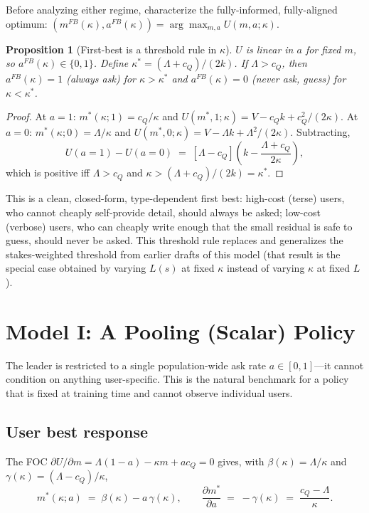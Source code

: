 \documentclass[11pt]{article}
\newtheorem{proposition}{Proposition}
\begin{document}
Before analyzing either regime, characterize the fully-informed, fully-aligned
optimum: $(m^{FB}(\kappa), a^{FB}(\kappa)) = \arg\max_{m,a} U(m,a;\kappa)$.

\begin{proposition}[First-best is a threshold rule in $\kappa$]\label{prop:firstbest}
$U$ is linear in $a$ for fixed $m$, so $a^{FB}(\kappa) \in \{0,1\}$. Define
$\kappa^* = (\Lambda+c_Q)/(2k)$. If $\Lambda > c_Q$, then $a^{FB}(\kappa)=1$
(always ask) for $\kappa > \kappa^*$ and $a^{FB}(\kappa)=0$ (never ask, guess) for
$\kappa < \kappa^*$.
\end{proposition}

\begin{proof}
At $a=1$: $m^*(\kappa;1)=c_Q/\kappa$ and $U(m^*,1;\kappa)=V-c_Qk+c_Q^2/(2\kappa)$.
At $a=0$: $m^*(\kappa;0)=\Lambda/\kappa$ and
$U(m^*,0;\kappa)=V-\Lambda k+\Lambda^2/(2\kappa)$. Subtracting,
\[
U(a{=}1)-U(a{=}0) \;=\; [\Lambda-c_Q]\left(k - \frac{\Lambda+c_Q}{2\kappa}\right),
\]
which is positive iff $\Lambda>c_Q$ and $\kappa>(\Lambda+c_Q)/(2k)=\kappa^*$.
\end{proof}

This is a clean, closed-form, type-dependent first best: high-cost (terse) users,
who cannot cheaply self-provide detail, should always be asked; low-cost (verbose)
users, who can cheaply write enough that the small residual is safe to guess,
should never be asked. This threshold rule replaces and generalizes the
stakes-weighted threshold from earlier drafts of this model (that result is the
special case obtained by varying $L(s)$ at fixed $\kappa$ instead of varying
$\kappa$ at fixed $L$).

\section{Model I: A Pooling (Scalar) Policy}
\label{sec:model1}

The leader is restricted to a single population-wide ask rate $a\in[0,1]$---it
cannot condition on anything user-specific. This is the natural benchmark for a
policy that is fixed at training time and cannot observe individual users.

\subsection{User best response}

The FOC $\partial U/\partial m = \Lambda(1-a) - \kappa m + ac_Q = 0$ gives, with
$\beta(\kappa)=\Lambda/\kappa$ and $\gamma(\kappa)=(\Lambda-c_Q)/\kappa$,
\[
m^*(\kappa;a) \;=\; \beta(\kappa) - a\,\gamma(\kappa), \qquad
\frac{\partial m^*}{\partial a} \;=\; -\gamma(\kappa) \;=\; \frac{c_Q-\Lambda}{\kappa}.
\]
\end{document}
